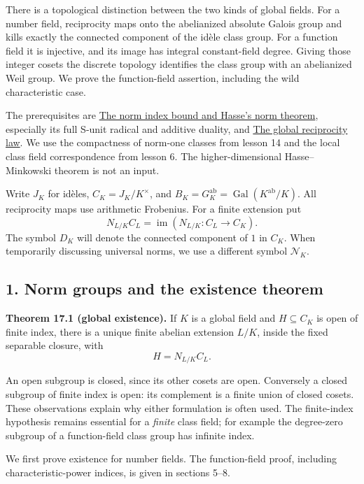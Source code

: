 \documentclass[11pt,a4paper]{article}
\begin{document}
There is a topological distinction between the two kinds of global
fields. For a number field, reciprocity maps onto the abelianized
absolute Galois group and kills exactly the connected component of the
idèle class group. For a function field it is injective, and its image
has integral constant-field degree. Giving those integer cosets the
discrete topology identifies the class group with an abelianized Weil
group. We prove the function-field assertion, including the wild
characteristic case.

The prerequisites are
\href{../the-norm-index-bound-and-hasses-norm-theorem.html}{The norm
index bound and Hasse's norm theorem}, especially its full S-unit
radical and additive duality, and
\href{../the-global-reciprocity-law.html}{The global reciprocity law}.
We use the compactness of norm-one classes from lesson 14 and the local
class field correspondence from lesson 6. The higher-dimensional
Hasse--Minkowski theorem is not an input.

Write \(J_K\) for idèles, \(C_K=J_K/K^\times\), and
\(B_K=G_K^{\mathrm{ab}}=\operatorname{Gal}(K^{\mathrm{ab}}/K)\). All
reciprocity maps use arithmetic Frobenius. For a finite extension put \[
N_{L/K}C_L=\operatorname{im}(N_{L/K}:C_L\longrightarrow C_K).
\] The symbol \(D_K\) will denote the connected component of \(1\) in
\(C_K\). When temporarily discussing universal norms, we use a different
symbol \(\mathcal N_K\).

\subsection{1. Norm groups and the existence
theorem}\label{norm-groups-and-the-existence-theorem}

\textbf{Theorem 17.1 (global existence).} If \(K\) is a global field and
\(H\subseteq C_K\) is open of finite index, there is a unique finite
abelian extension \(L/K\), inside the fixed separable closure, with \[
H=N_{L/K}C_L.
\tag{1}
\]

An open subgroup is closed, since its other cosets are open. Conversely
a closed subgroup of finite index is open: its complement is a finite
union of closed cosets. These observations explain why either
formulation is often used. The finite-index hypothesis remains essential
for a \emph{finite} class field; for example the degree-zero subgroup of
a function-field class group has infinite index.

We first prove existence for number fields. The function-field proof,
including characteristic-power indices, is given in sections 5--8.
\end{document}
